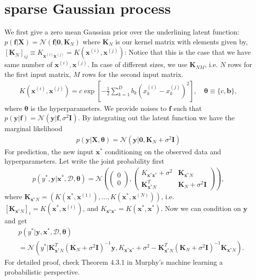 \documentclass[10pt,a4paper]{article}
\begin{document}
\section{sparse Gaussian process}
We first give a zero mean Gaussian prior over the underlining latent function: $p(\pmb{f}|\pmb{X})=\mathcal{N}(\pmb{f}|\pmb{0},\pmb{K}_N)$ where $\pmb{K}_N$ is our kernel matrix with elements given by, $[\pmb{K}_N]_{ij}\equiv K_{\pmb{x}^{(i)}\pmb{x}^{(j)}}=K(\pmb{x}^{(i)},\pmb{x}^{(j)})$: Notice that this is the case that we have same number of $\pmb{x}^{(i)},\pmb{x}^{(j)}$. In case of different sizes, we use $\pmb{K}_{NM}$, i.e. $N$ rows for the first input matrix, $M$ rows for the second input matrix.
\begin{align}
K(\pmb{x}^{(i)},\pmb{x}^{(j)})=c\exp [-\frac{1}{2}\sum_{k=1}^{D}b_k(x^{(i)}_k-x^{(j)}_k)^2], \quad\pmb{\theta}\equiv \lbrace c,\pmb{b}\rbrace,
\end{align}
where $\pmb{\theta}$ is the hyperparameters.
We provide noises to $\pmb{f}$ such that $p(\pmb{y}|\pmb{f})=\mathcal{N}(\pmb{y}|\pmb{f},\sigma^2\pmb{I})$. By integrating out the latent function we have the marginal likelihood
\begin{align}
p(\pmb{y}|\pmb{X},\pmb{\theta})=\mathcal{N}(\pmb{y}|\pmb{0},\pmb{K}_N+\sigma^2\pmb{I})
\end{align}
For prediction, the new input $\pmb{x}^*$ conditioning on the observed data and hyperparameters. Let write the joint probability first
\begin{align}
p(y^*,\pmb{y}|\pmb{x}^*,\mathcal{D},\pmb{\theta})=\mathcal{N}\left(\begin{pmatrix}
0\\0
\end{pmatrix},\begin{pmatrix}
K_{\pmb{x}^*\pmb{x}^*}+\sigma^2 & \pmb{K}_{\pmb{x}^*N}\\
\pmb{K}_{\pmb{x}^*N}^T & \pmb{K}_N+\sigma^2\pmb{I} 
\end{pmatrix}\right),
\label{cgjoint}
\end{align}
where $\pmb{K}_{\pmb{x}^*N}=(K(\pmb{x}^*,\pmb{x}^{(1)}),\dots,K(\pmb{x}^*,\pmb{x}^{(N)}))$, i.e. $[\pmb{K}_{\pmb{x}^*N}]_{i}=K(\pmb{x}^*,\pmb{x}^{(i)})$, and $K_{\pmb{x}^*\pmb{x}^*}=K(\pmb{x}^*,\pmb{x}^*)$. 
Now we can condition on $\pmb{y}$ and get
\begin{align}
&p(y^*|\pmb{y},\pmb{x}^*,\mathcal{D},\pmb{\theta})\nonumber\\
&=\mathcal{N}(y^*|\pmb{K}_{\pmb{x}^*N}^T(\pmb{K}_N+\sigma^2\pmb{I})^{-1}\pmb{y},K_{\pmb{x}^*\pmb{x}^*}+\sigma^2-\pmb{K}_{\pmb{x}^*N}^T(\pmb{K}_N+\sigma^2\pmb{I})^{-1}\pmb{K}_{\pmb{x}^*N}).
\label{cgcondition}
\end{align}
For detailed proof, check Theorem 4.3.1 in Murphy's machine learning a probabilistic perspective.
\end{document}
